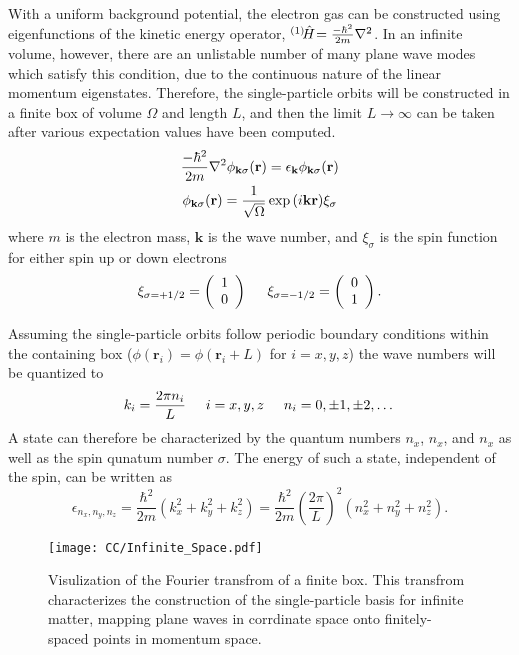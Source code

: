 \documentclass[thesis.tex]{subfiles}
\begin{document}
With a uniform background potential, the electron gas can be constructed using eigenfunctions of the kinetic energy operator, ${}^{\left(1\right)}\hspace{-2pt}\hat{H}\hspace{-2pt} = \frac{-\hbar^{2}}{2m}\nabla^{2}$.  In an infinite volume, however, there are an unlistable number of many plane wave modes which satisfy this condition, due to the continuous nature of the linear momentum eigenstates.  Therefore, the single-particle orbits will be constructed in a finite box of volume $\Omega$ and length $L$, and then the limit $L\rightarrow \infty$ can be taken after various expectation values have been computed.
\begin{gather} \label{eq:plane_wave}
  \frac{-\hbar^{2}}{2m}\nabla^{2}\phi_{\mathbf{k}\sigma}(\mathbf{r}) = \epsilon_{\mathbf{k}}\phi_{\mathbf{k}\sigma}(\mathbf{r}) \notag \\
  \phi_{\mathbf{k}\sigma}(\mathbf{r}) = \frac{1}{\sqrt{\Omega}}\exp{(i\mathbf{kr})}\xi_{\sigma}
\end{gather}
where $m$ is the electron mass, $\mathbf{k}$ is the wave number, and $\xi_{\sigma}$ is the spin function for either spin up or down electrons
\begin{equation}
  \xi_{\sigma=+1/2} = \left(\begin{array}{c} 1
    \\ 0 \end{array}\right) \hspace{0.5cm}
  \xi_{\sigma=-1/2} = \left(\begin{array}{c} 0 \\ 1 \end{array}\right).
\end{equation}

Assuming the single-particle orbits follow periodic boundary conditions within the containing box ($\phi(\mathbf{r}_{i}) = \phi(\mathbf{r}_{i} + L)$ for $i = x,y,z$) the wave numbers will be quantized to
\begin{equation}
  k_{i} = \frac{2\pi n_{i}}{L}\hspace{0.5cm} i = x,y,z \hspace{0.5cm} n_{i} = 0, \pm 1, \pm 2, \dots
\end{equation}
A state can therefore be characterized by the quantum numbers $n_{x}$, $n_{x}$, and $n_{x}$ as well as the spin qunatum number $\sigma$.  The energy of such a state, independent of the spin, can be written as
\begin{equation} \label{eq:infinite_energy}
  \epsilon_{n_{x}, n_{y}, n_{z}} = \frac{\hbar^2}{2m}\left(k_{x}^{2} + k_{y}^{2} + k_{z}^{2}\right) = \frac{\hbar^{2}}{2m}\left(\frac{2\pi }{L}\right)^{2} \left( n_{x}^{2} + n_{y}^{2} + n_{z}^{2}\right).
\end{equation}
\begin{figure}[h]
  \centering
  \texttt{[image: CC/Infinite\_Space.pdf]}
  \caption{Visulization of the Fourier transfrom of a finite box.  This transfrom characterizes the construction of the single-particle basis for infinite matter, mapping plane waves in corrdinate space onto finitely-spaced points in momentum space.}
  \label{fig:infinite_space}
\end{figure}
\end{document}
